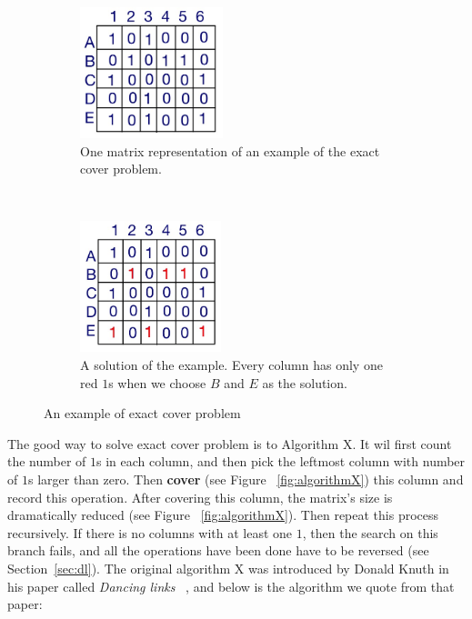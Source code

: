 \begin{figure}[ht]
  \centering
  \begin{subfigure}[t]{0.5\textwidth}
    \includegraphics[height=1.5in]{figure/ecp_1.JPG}
    \caption{One matrix representation of an example of the exact cover problem.}
    \label{fig:ecp_1}
  \end{subfigure}%
  ~  
  \begin{subfigure}[t]{0.5\textwidth}
    \includegraphics[height=1.5in]{figure/ecp_2.JPG}
    \caption{A solution of the example. Every column has only one red $1$s when we choose $B$ and $E$ as the solution. }
    \label{fig:ecp_2}
  \end{subfigure}%
  \caption{An example of exact cover problem}
  \label{fig:ecp}
\end{figure}

The good way to solve exact cover problem  is to Algorithm X. It wil first count the number of $1$s in each column, and then pick the leftmost column with number of $1$s larger than zero. Then \textbf{cover} (see Figure ~\ref{fig:algorithmX}) this column and record this operation. After covering this column, the matrix's size is dramatically reduced (see Figure ~\ref{fig:algorithmX}). Then repeat this process recursively. If there is no columns with at least one $1$, then the search on this branch fails, and all the operations have been done have to be reversed (see Section~\ref{sec:dl}). The original algorithm X was introduced by Donald Knuth in his paper called \textit{Dancing links} ~\cite{knuth_dancing_2000}, and below is the algorithm we quote from that paper:

